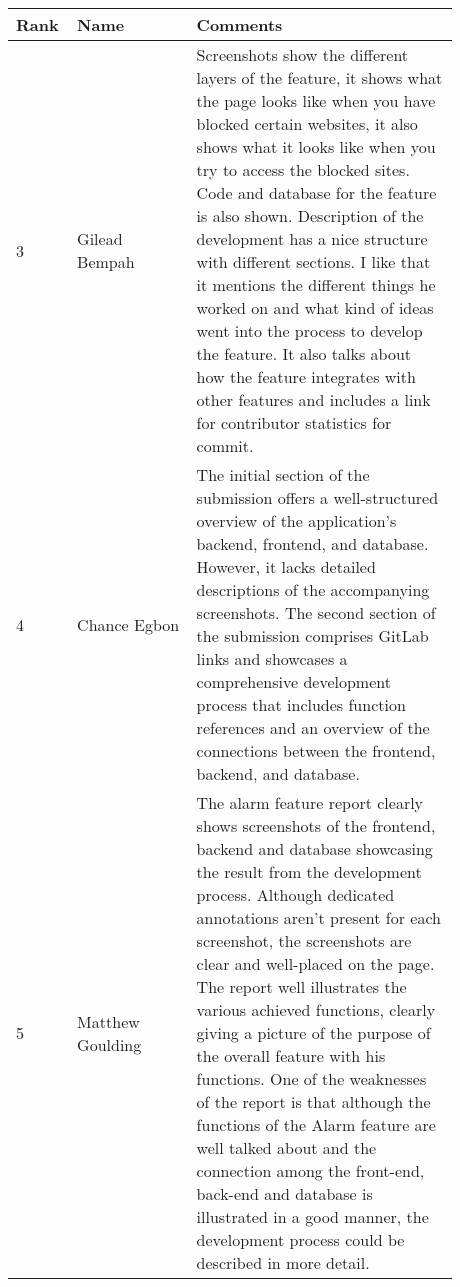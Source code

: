 \documentclass[a4paper]{article}
\begin{document}
 {\noindent\begin{tabular}{|p{0.075\linewidth}|p{0.25\linewidth}|p{0.55\linewidth}|} 
	\hline
 \textbf{Rank} & \textbf{Name} & \textbf{Comments} \\
 \hline
 3 & Gilead Bempah & Screenshots show the different layers of the feature, it shows what the page looks like when you have blocked certain websites, it also shows what it looks like when you try to access the blocked sites. Code and database for the feature is also shown. Description of the development has a nice structure with different sections. I like that it mentions the different things he worked on and what kind of ideas went into the process to develop the feature. It also talks about how the feature integrates with other features and includes a link for contributor statistics for commit.\\
 \hline
 4	 & Chance Egbon& The initial section of the submission offers a well-structured overview of the application's backend, frontend, and database. However, it lacks detailed descriptions of the accompanying screenshots. The second section of the submission comprises GitLab links and showcases a comprehensive development process that includes function references and an overview of the connections between the frontend, backend, and database.\\
 \hline
 5 & Matthew Goulding & The alarm feature report clearly shows screenshots of the frontend, backend and database showcasing the result from the development process. Although dedicated annotations aren’t present for each screenshot, the screenshots are clear and well-placed on the page.  The report well illustrates the various achieved functions, clearly giving a picture of the purpose of the overall feature with his functions.  One of the weaknesses of the report is that although the functions of the Alarm feature are well talked about and the connection among the front-end, back-end and database is illustrated in a good manner, the development process could be described in more detail.\\
 \hline
\end{tabular}}
\end{document}
